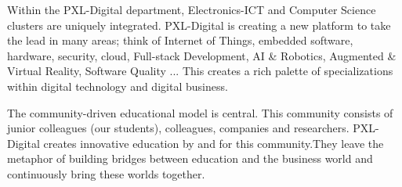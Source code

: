Within the PXL-Digital department, Electronics-ICT and Computer Science clusters are uniquely integrated. 
PXL-Digital is creating a new platform to take the lead in many areas; think of Internet of Things, embedded software,
 hardware, security, cloud, Full-stack Development, AI \& Robotics, Augmented \& Virtual Reality, Software Quality 
 ... This creates a rich palette of specializations within digital technology and digital business.

The community-driven educational model is central. This community consists of junior colleagues (our students), 
colleagues, companies and researchers. PXL-Digital creates innovative education by and for this community.They leave the 
metaphor of building bridges between education and the business world and continuously bring these worlds together. 

